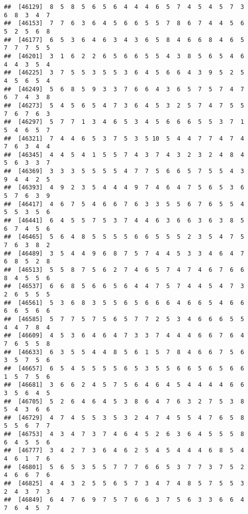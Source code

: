 \documentclass[
]{book}
\begin{document}
\begin{verbatim}
##  [46129]  8  5  8  5  6  5  6  4  4  4  6  5  7  4  5  4  5  7  3  6  8  3  4  7
##  [46153]  7  7  6  3  6  4  5  6  6  5  5  7  8  6  7  4  4  5  6  5  2  5  6  8
##  [46177]  6  5  3  6  4  6  3  4  3  6  5  8  4  6  6  8  4  6  5  7  7  7  5  5
##  [46201]  3  1  6  2  2  6  5  6  6  5  5  4  3  8  5  6  5  4  6  4  4  3  5  4
##  [46225]  3  7  5  5  3  5  5  3  6  4  5  6  6  4  3  9  5  2  5  4  5  6  5  4
##  [46249]  5  6  8  5  9  3  3  7  6  6  4  3  6  5  7  5  7  4  7  6  7  4  3  8
##  [46273]  5  4  5  6  5  4  7  3  6  4  5  3  2  5  7  4  7  5  5  7  6  7  6  3
##  [46297]  5  7  7  1  3  4  6  5  3  4  5  6  6  6  5  5  3  7  1  5  4  6  5  7
##  [46321]  7  4  4  6  5  3  7  5  3  5 10  5  4  4  7  7  4  7  4  7  6  3  4  4
##  [46345]  4  4  5  4  1  5  5  7  4  3  7  4  3  2  3  2  4  8  4  5  6  3  3  7
##  [46369]  3  3  3  5  5  5  5  4  7  7  5  6  6  5  7  5  5  4  3  9  4  4  2  5
##  [46393]  4  9  2  3  5  4  4  4  9  7  4  6  4  7  5  6  5  3  6  5  7  6  3  9
##  [46417]  4  6  7  5  4  6  6  7  6  3  3  5  5  6  7  6  5  5  4  5  5  3  5  6
##  [46441]  6  4  5  5  7  5  3  7  4  4  6  3  6  6  3  6  3  8  5  6  7  4  5  6
##  [46465]  5  6  4  8  5  5  5  5  6  6  5  5  5  2  3  5  4  7  5  7  6  3  8  2
##  [46489]  3  5  4  4  9  6  8  7  5  7  4  4  5  3  3  4  6  4  7  6  8  5  2  8
##  [46513]  5  5  8  7  5  6  2  7  4  6  5  7  4  7  4  6  7  6  6  8  4  5  5  6
##  [46537]  6  6  8  5  6  6  5  6  4  4  7  5  7  4  4  5  4  7  3  2  6  5  5  5
##  [46561]  5  3  6  8  3  5  5  6  5  6  6  6  4  6  6  5  4  6  6  6  6  5  6  6
##  [46585]  5  7  7  5  7  5  6  5  7  7  2  5  3  4  6  6  6  5  5  4  4  7  8  4
##  [46609]  4  5  3  6  4  6  4  7  3  3  7  4  4  4  6  6  7  6  4  7  6  5  5  8
##  [46633]  6  3  5  5  4  4  8  5  6  1  5  7  8  4  6  6  7  5  6  3  5  7  5  6
##  [46657]  6  5  4  5  5  5  5  6  5  3  5  5  6  6  5  6  5  6  6  1  5  7  5  6
##  [46681]  3  6  6  2  4  5  7  5  6  4  6  4  5  4  4  4  4  6  6  3  5  6  4  5
##  [46705]  5  2  6  4  6  4  5  3  8  6  4  7  6  3  2  7  5  3  8  5  4  3  6  6
##  [46729]  4  7  4  5  5  3  5  3  2  4  7  4  5  5  4  7  6  5  8  5  5  6  7  7
##  [46753]  4  3  4  7  3  7  4  6  4  5  2  6  3  6  4  5  5  5  8  6  4  5  5  6
##  [46777]  3  4  2  7  3  6  4  6  2  5  4  5  4  4  4  6  8  5  4  4  6  1  7  6
##  [46801]  5  6  5  3  5  5  7  7  7  6  6  5  3  7  7  3  7  5  2  4  6  6  7  6
##  [46825]  4  4  3  2  5  5  6  5  7  3  4  7  4  8  5  7  5  5  3  2  4  3  7  3
##  [46849]  6  4  7  6  9  7  5  7  6  6  3  7  5  6  3  3  6  6  4  7  6  4  5  7

\end{verbatim}
\end{document}
